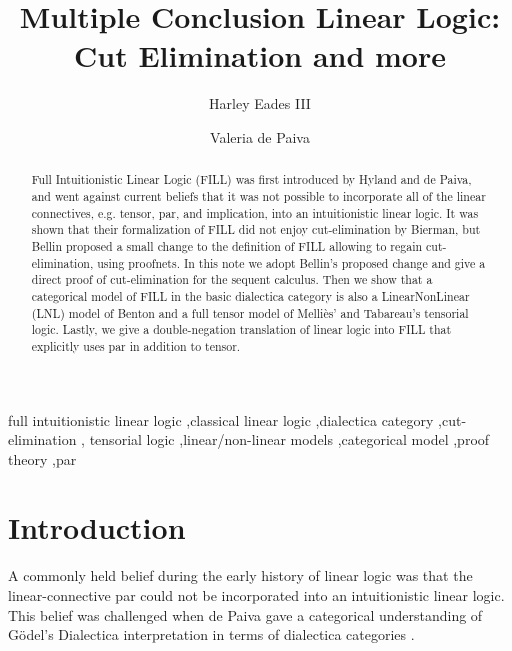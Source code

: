\documentclass{elsarticle}
\title{Multiple Conclusion Linear Logic: \\ Cut Elimination and more}
\author[au]{Harley Eades III\corref{cor1}}
\author[nuance]{Valeria de Paiva}
\date{}
\begin{document}

\newcommand{\rcond}[0]{\refstepcounter{condCounter}\arabic{condCounter}}




\begin{abstract}
  Full Intuitionistic Linear Logic (FILL) was first introduced by
  Hyland and de Paiva, and went against current beliefs that it was
  not possible to incorporate all of the linear connectives,
  e.g. tensor, par, and implication, into an intuitionistic linear
  logic. It was shown that their formalization of FILL did not enjoy
  cut-elimination by Bierman, but Bellin proposed a small change to the
  definition of FILL allowing to regain cut-elimination, using proofnets.  
  In this note we adopt Bellin's proposed change and give a direct proof of
  cut-elimination for the sequent calculus.  
  Then we show that a categorical model of FILL in
  the basic dialectica category is also a LinearNonLinear (LNL)
  model of Benton and a
  full tensor model of Melli\`es' and Tabareau's tensorial logic.
  Lastly, we give a double-negation translation of linear logic into
  FILL that explicitly uses par in addition to tensor.
\end{abstract}

\begin{keyword}
full intuitionistic linear logic \sep classical linear
  logic \sep dialectica category \sep cut-elimination \sep
  tensorial logic \sep linear/non-linear models \sep categorical
  model \sep proof theory \sep par
\end{keyword}

\maketitle

\section{Introduction}
\label{sec:introduction}

A commonly held belief during the early history of linear logic was
that the linear-connective par could not be incorporated into an
intuitionistic linear logic.  This belief was challenged when de Paiva
gave a categorical understanding of G\"odel's Dialectica
interpretation in terms of dialectica categories
\cite{dePaiva:1987,dePaiva:1988}.  
\end{document}
